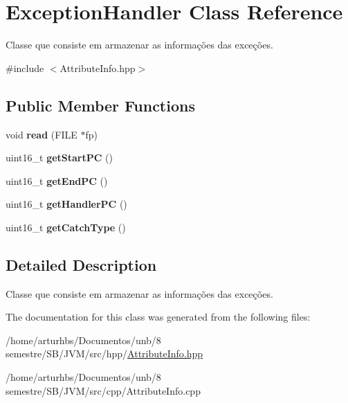 \hypertarget{classExceptionHandler}{}\section{Exception\+Handler Class Reference}
\label{classExceptionHandler}


Classe que consiste em armazenar as informações das exceções.  




{\ttfamily \#include $<$Attribute\+Info.\+hpp$>$}

\subsection*{Public Member Functions}
\begin{DoxyCompactItemize}
\item 
void {\bfseries read} (F\+I\+LE $\ast$fp)\hypertarget{classExceptionHandler_a9136c36e6dda68b55ad760623a4af5fc}{}\label{classExceptionHandler_a9136c36e6dda68b55ad760623a4af5fc}

\item 
uint16\+\_\+t {\bfseries get\+Start\+PC} ()\hypertarget{classExceptionHandler_a25e0e210e6638a16f2d2ae43cb9e63b2}{}\label{classExceptionHandler_a25e0e210e6638a16f2d2ae43cb9e63b2}

\item 
uint16\+\_\+t {\bfseries get\+End\+PC} ()\hypertarget{classExceptionHandler_abb77266bac3ca92769525b3a19ce07cd}{}\label{classExceptionHandler_abb77266bac3ca92769525b3a19ce07cd}

\item 
uint16\+\_\+t {\bfseries get\+Handler\+PC} ()\hypertarget{classExceptionHandler_a5288882b315614cd18ff3935d3b7deb7}{}\label{classExceptionHandler_a5288882b315614cd18ff3935d3b7deb7}

\item 
uint16\+\_\+t {\bfseries get\+Catch\+Type} ()\hypertarget{classExceptionHandler_a841a52c00770c5967c578918d3dfbde8}{}\label{classExceptionHandler_a841a52c00770c5967c578918d3dfbde8}

\end{DoxyCompactItemize}


\subsection{Detailed Description}
Classe que consiste em armazenar as informações das exceções. 

The documentation for this class was generated from the following files\+:\begin{DoxyCompactItemize}
\item 
/home/arturhbs/\+Documentos/unb/8 semestre/\+S\+B/\+J\+V\+M/src/hpp/\hyperlink{AttributeInfo_8hpp}{Attribute\+Info.\+hpp}\item 
/home/arturhbs/\+Documentos/unb/8 semestre/\+S\+B/\+J\+V\+M/src/cpp/Attribute\+Info.\+cpp\end{DoxyCompactItemize}

